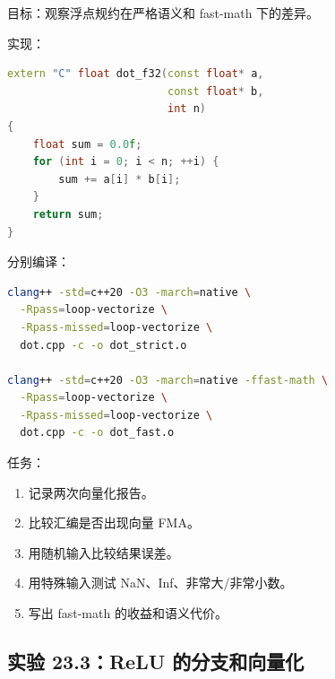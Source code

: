 \begin{labbox}
目标：观察浮点规约在严格语义和 fast-math 下的差异。

实现：

\begin{lstlisting}[language=C++]
extern "C" float dot_f32(const float* a,
                         const float* b,
                         int n)
{
    float sum = 0.0f;
    for (int i = 0; i < n; ++i) {
        sum += a[i] * b[i];
    }
    return sum;
}
\end{lstlisting}

分别编译：

\begin{lstlisting}[language=bash]
clang++ -std=c++20 -O3 -march=native \
  -Rpass=loop-vectorize \
  -Rpass-missed=loop-vectorize \
  dot.cpp -c -o dot_strict.o

clang++ -std=c++20 -O3 -march=native -ffast-math \
  -Rpass=loop-vectorize \
  -Rpass-missed=loop-vectorize \
  dot.cpp -c -o dot_fast.o
\end{lstlisting}

任务：

\begin{enumerate}
  \item 记录两次向量化报告。
  \item 比较汇编是否出现向量 FMA。
  \item 用随机输入比较结果误差。
  \item 用特殊输入测试 NaN、Inf、非常大/非常小数。
  \item 写出 fast-math 的收益和语义代价。
\end{enumerate}
\end{labbox}

\subsection{实验 23.3：ReLU 的分支和向量化}


